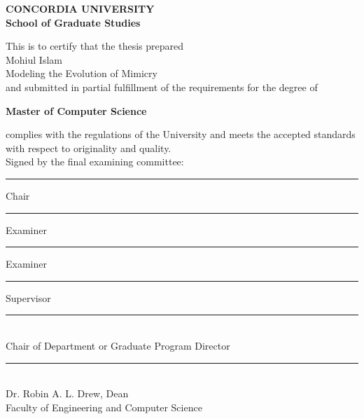 \begin{titlepage}
\begin{center}
\Large \textbf{CONCORDIA UNIVERSITY}\\
\Large \textbf{School of Graduate Studies}\\[2cm]
\end{center}
This is to certify that the thesis prepared\\
 Mohiul Islam\\
  Modeling the Evolution of Mimicry\\
and submitted in partial fulfillment of the requirements for the degree of
\begin{center}
\small \textbf{Master of Computer Science}\\
\end{center}
complies with the regulations of the University and meets the accepted standards with respect to originality and quality.\\[1cm]
Signed by the final examining committee:\\

\begin{flushright}
\begin{minipage}{10cm}
\rule{7cm}{0.1mm} Chair\\[0.4cm]
\rule{7cm}{0.1mm} Examiner\\[0.4cm]
\rule{7cm}{0.1mm} Examiner\\[0.4cm]
\rule{7cm}{0.1mm} Supervisor\\[0.8cm]
\end{minipage}
\end{flushright}
 \rule{10cm}{0.1mm}\\ 
\makebox[5cm][l]{} Chair of Department or Graduate Program Director\\[1cm]
 \rule{10cm}{0.1mm}\\ 
\makebox[5cm][l]{} Dr. Robin A. L. Drew, Dean \\
\makebox[5cm][l]{} Faculty of Engineering and Computer Science

\end{titlepage}